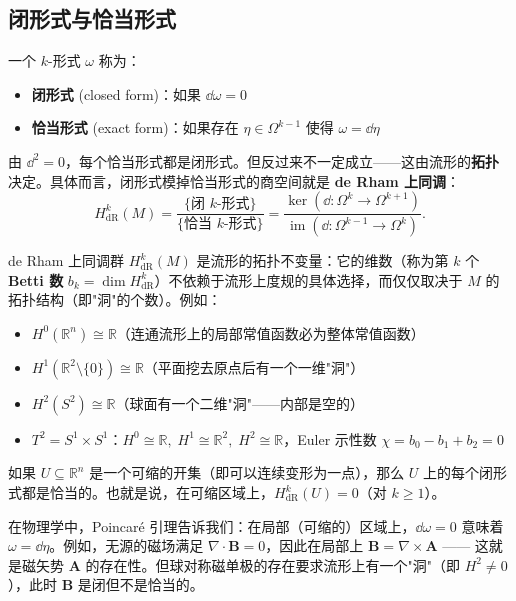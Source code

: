 \subsection{闭形式与恰当形式}

\begin{definition}[闭形式与恰当形式]
一个 $k$-形式 $\omega$ 称为：
\begin{itemize}
    \item \textbf{闭形式} (closed form)：如果 $\dd\omega = 0$
    \item \textbf{恰当形式} (exact form)：如果存在 $\eta \in \Omega^{k-1}$ 使得 $\omega = \dd\eta$
\end{itemize}
\end{definition}

由 $\dd^2 = 0$，每个恰当形式都是闭形式。但反过来不一定成立——这由流形的\textbf{拓扑}决定。具体而言，闭形式模掉恰当形式的商空间就是 \textbf{de Rham 上同调}：
\begin{equation}
    H^k_{\text{dR}}(M) = \frac{\{\text{闭 } k\text{-形式}\}}{\{\text{恰当 } k\text{-形式}\}} = \frac{\ker(\dd: \Omega^k \to \Omega^{k+1})}{\operatorname{im}(\dd: \Omega^{k-1} \to \Omega^k)}.
\end{equation}

de Rham 上同调群 $H^k_{\text{dR}}(M)$ 是流形的拓扑不变量：它的维数（称为第 $k$ 个 \textbf{Betti 数} $b_k = \dim H^k_{\text{dR}}$）不依赖于流形上度规的具体选择，而仅仅取决于 $M$ 的拓扑结构（即"洞"的个数）。例如：
\begin{itemize}
    \item $H^0(\mathbb{R}^n) \cong \mathbb{R}$（连通流形上的局部常值函数必为整体常值函数）
    \item $H^1(\mathbb{R}^2 \setminus \{0\}) \cong \mathbb{R}$（平面挖去原点后有一个一维"洞"）
    \item $H^2(S^2) \cong \mathbb{R}$（球面有一个二维"洞"——内部是空的）
    \item $T^2 = S^1 \times S^1$：$H^0 \cong \mathbb{R},\; H^1 \cong \mathbb{R}^2,\; H^2 \cong \mathbb{R}$，Euler 示性数 $\chi = b_0 - b_1 + b_2 = 0$
\end{itemize}

\begin{theorem}[Poincaré 引理]
如果 $U \subseteq \mathbb{R}^n$ 是一个可缩的开集（即可以连续变形为一点），那么 $U$ 上的每个闭形式都是恰当的。也就是说，在可缩区域上，$H^k_{\text{dR}}(U) = 0$（对 $k \geq 1$）。
\end{theorem}

\begin{note}[物理意义]
在物理学中，Poincaré 引理告诉我们：在局部（可缩的）区域上，$\dd\omega = 0$ 意味着 $\omega = \dd\eta$。例如，无源的磁场满足 $\nabla \cdot \mathbf{B} = 0$，因此在局部上 $\mathbf{B} = \nabla \times \mathbf{A}$ —— 这就是磁矢势 $\mathbf{A}$ 的存在性。但球对称磁单极的存在要求流形上有一个"洞"（即 $H^2 \neq 0$），此时 $\mathbf{B}$ 是闭但不是恰当的。
\end{note}

